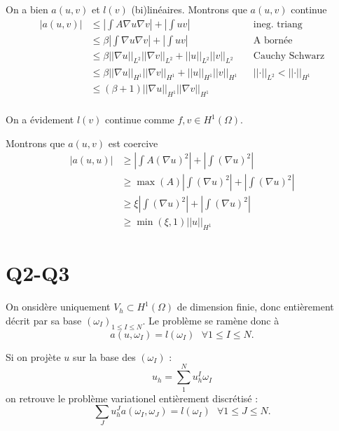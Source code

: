 \documentclass[11pt]{article}
\newcommand{\ms}{~~~}
\newcommand{\norm}[1]{\left|\left|#1\right|\right|}
\begin{document}
On a bien $a(u,v)$ et $l(v)$ (bi)linéaires. Montrons que $a(u,v)$ continue 
\begin{align}
  \label{eq:ac}
  |a(u,v)| &\leq \left| \int A \nabla u \nabla v \right| + \left| \int u v \right| && \mbox{ineg. triang} \\
           &\leq \beta \left| \int \nabla u \nabla v \right| + \left| \int u v \right| && \mbox{A bornée} \\
           &\leq \beta \norm{\nabla u}_{L^2} \norm{\nabla v}_{L^2} + \norm{u}_{L^2}\norm{v}_{L^2} && \mbox{Cauchy Schwarz} \\
           &\leq \beta \norm{\nabla u}_{H^1} \norm{\nabla v}_{H^1} + \norm{u}_{H^1}\norm{v}_{H^1} && \norm{\cdot}_{L^2}<\norm{\cdot}_{H^1} \\
           &\leq (\beta+1) \norm{\nabla u}_{H^1} \norm{\nabla v}_{H^1}   \\
\end{align}

On a évidement $l(v)$ continue comme $f, v \in H^1(\Omega)$. 

Montrons que $a(u,v)$ est coercive
\begin{align}
  \label{eq:co}
  |a(u,u)| &\geq \left|\int A (\nabla u)^2 \right| + \left|\int (\nabla u)^2 \right| \\
           &\geq \max(A) \left|\int (\nabla u)^2 \right| + \left|\int (\nabla u)^2 \right| \\
           &\geq \xi \left|\int (\nabla u)^2 \right| + \left|\int (\nabla u)^2 \right| \\
           &\geq \min(\xi,1) \norm{u}_{H^1}
\end{align}

\section{Q2-Q3}

On onsidère uniquement $V_h \subset H^1(\Omega)$ de dimension finie, donc entièrement décrit par sa base $(\omega_I)_{1\leq I \leq N}$. Le problème se ramène donc à
\begin{equation}
  a(u,\omega_I) = l(\omega_I) \ms \forall 1\leq I\leq N.
\end{equation}

Si on projète $u$ sur la base des $(\omega_I)$ :
\begin{equation}
  u_h = \sum_{1}^{N} u_h^I \omega_I
\end{equation}
on retrouve le problème variationel entièrement discrétisé :
\begin{equation}
  \sum_J u_h^J a(\omega_I, \omega_J) = l(\omega_I) \ms \forall  1\leq J\leq N.   
\end{equation}
\end{document}
